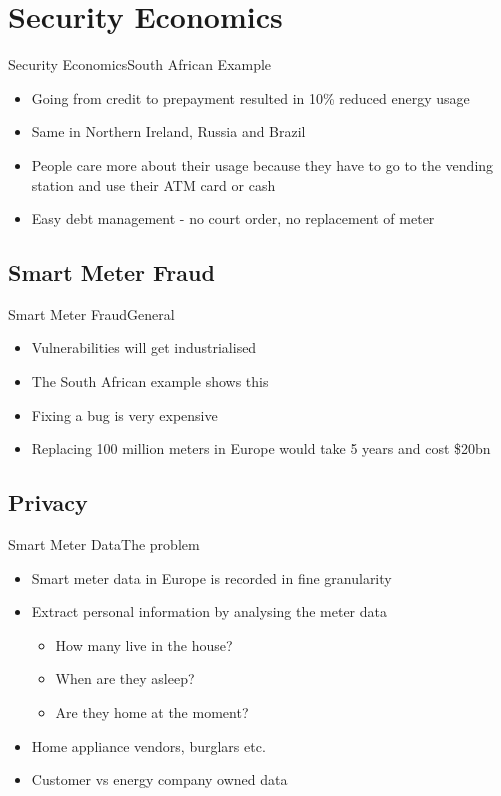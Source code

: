 \documentclass[10pt]{beamer}
\begin{document}
\section{Security Economics}
\begin{frame}{Security Economics}{South African Example}
	\begin{itemize}
		\item Going from credit to prepayment resulted in 10\% reduced energy usage
		\item Same in Northern Ireland, Russia and Brazil
		\item People care more about their usage because they have to go to the vending station and use their ATM card or cash
		\item Easy debt management - no court order, no replacement of meter 
	\end{itemize}
\end{frame}

\subsection{Smart Meter Fraud}
\begin{frame}{Smart Meter Fraud}{General}
	\begin{itemize}
		\item Vulnerabilities will get industrialised
		\item The South African example shows this 
		\item Fixing a bug is very expensive
		\item Replacing 100 million meters in Europe would take 5 years and cost \$20bn
	\end{itemize}
\end{frame}

\subsection{Privacy}
\begin{frame}{Smart Meter Data}{The problem}
	\begin{itemize}
		\item Smart meter data in Europe is recorded in fine granularity
		\item Extract personal information by analysing the meter data
		\begin{itemize}
			\item How many live in the house?
			\item When are they asleep?
			\item Are they home at the moment?
		\end{itemize}
		\item Home appliance vendors, burglars etc.
		\item Customer vs energy company owned data
	\end{itemize}
\end{frame}
\end{document}
